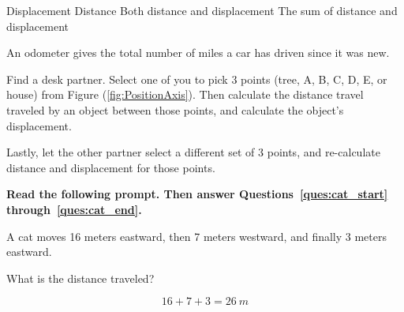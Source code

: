 \documentclass[answers]{exam}
\begin{document}
\begin{questions}
\begin{questions}
\begin{choices}
\choice Displacement
\CorrectChoice Distance
\choice Both distance and displacement
\choice The sum of distance and displacement
\end{choices}

\begin{solution}
An odometer gives the total number of miles a car has driven since it was new. 
\end{solution}

\question
Find a desk partner. Select one of you to pick 3 points (tree, A, B, C, D, E, or house) from Figure (\ref{fig:PositionAxis}). Then calculate the distance travel traveled by an object between those points, and calculate the object's displacement.

Lastly, let the other partner select a different set of 3 points, and re-calculate distance and displacement for those points. 

\clearpage
\begin{EnvUplevel}
\textbf{Read the following prompt. Then answer Questions~\ref{ques:cat_start} through~\ref{ques:cat_end}.} 
\end{EnvUplevel}
\vspace{-0.5em}

\begin{EnvUplevel}
A cat moves 16 meters eastward, then 7 meters westward, and finally 3 meters eastward.
\end{EnvUplevel}

\begin{figure}[h!]
    \centering
\end{figure}

\question \label{ques:cat_start}
What is the distance traveled?

\begin{solution}
\begin{equation*}
    16 + 7 + 3 = \SI{26}{m}
\end{equation*}
\end{solution}


\end{questions}
\end{questions}
\end{document}
